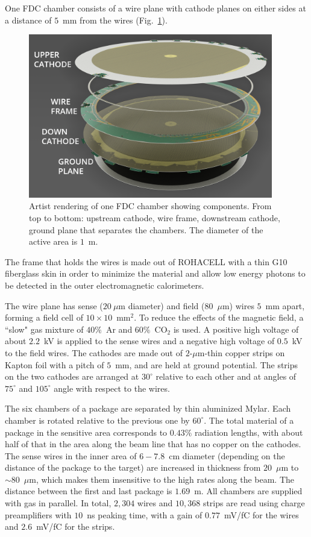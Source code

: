 One FDC chamber consists of a wire plane with cathode planes on either sides at a distance of $5$~mm from the wires (Fig.~\ref{FDC_OneCell}).
\begin{figure}[tbp]
\begin{center}
\includegraphics[width=0.95\textwidth]{figures/FDC_OneCell2.png} 
\caption{\label{FDC_OneCell}
Artist rendering of one FDC chamber showing components. From top to bottom: upstream cathode, wire frame, downstream cathode, ground plane that separates the chambers. The diameter of the active area is $1$~m.
}
\end{center}
\end{figure}
The frame that holds the wires is made out of ROHACELL with a thin
G10 fiberglass skin in order to minimize the material and
allow low energy photons to be detected in the outer electromagnetic calorimeters.

The wire plane has sense ($20~\mu$m diameter) and field ($80$~$\mu$m) wires $5$~mm apart, forming a field cell of $10\times 10$~mm$^2$. 
To reduce the effects of the magnetic field, 
a ``slow" gas mixture of $40\%$~Ar and $60\%$~CO$_2$ is used.
A positive high voltage of about $2.2$~kV is applied to the sense wires and a negative high voltage of $0.5$~kV to the field wires. 
The cathodes are made out of $2$-$\mu$m-thin copper strips on Kapton foil with a pitch of $5$~mm, and are held at ground potential. The strips on the two cathodes are arranged at $30^\circ $ relative to each other and at angles of $75^\circ $ and $105^\circ $ angle with respect to the wires.

The six chambers of a package are separated by thin aluminized Mylar.
Each chamber is rotated relative to the previous one by $60^\circ $.
The total material of a package in the sensitive area corresponds to $0.43\%$ radiation lengths, with about half of that in the area along the beam line that has no copper on the cathodes.
The sense wires in the inner area of $6-7.8$~cm diameter (depending on the distance of the package to the target) are increased in thickness from $20$~$\mu$m to $\sim 80$~$\mu$m, which makes them insensitive to the high rates along the beam.
The distance between the first and last package is $1.69$~m. 
All chambers are supplied with gas in parallel. 
In total, $2,304$ wires and $10,368$ strips are read using charge preamplifiers with $10$~ns peaking time, with a gain of $0.77$~mV/fC for the wires and $2.6$~mV/fC for the strips.


